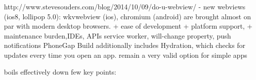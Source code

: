\documentclass[thesis.tex]{subfiles}
\begin{document}
http://www.stevesouders.com/blog/2014/10/09/do-u-webview/
- new webviews (ios8, lollipop 5.0): wkvwebview (ios), chromium (android)
are brought almost on par with modern desktop browsers.
+ ease of development
+ platform support,
+ maintenance burden,IDEs, APIs
service worker, will-change property, push notifications
PhoneGap Build additionally includes Hydration, which checks for updates every time you open an app.
remain a very valid option for simple apps

boils effectively down few key points:
\end{document}
